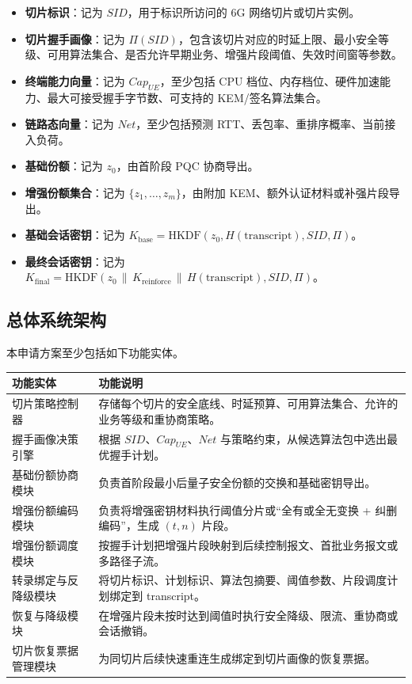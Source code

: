 \documentclass[12pt,a4paper]{article}
\newcommand{\Kfinal}{K_{\mathrm{final}}}
\newcommand{\Kbase}{K_{\mathrm{base}}}
\newcommand{\Krein}{K_{\mathrm{reinforce}}}
\begin{document}
\begin{itemize}[leftmargin=2em]
    \item \textbf{切片标识}：记为 $SID$，用于标识所访问的 6G 网络切片或切片实例。
    \item \textbf{切片握手画像}：记为 $\Pi(SID)$，包含该切片对应的时延上限、最小安全等级、可用算法集合、是否允许早期业务、增强片段阈值、失效时间窗等参数。
    \item \textbf{终端能力向量}：记为 $Cap_{UE}$，至少包括 CPU 档位、内存档位、硬件加速能力、最大可接受握手字节数、可支持的 KEM/签名算法集合。
    \item \textbf{链路态向量}：记为 $Net$，至少包括预测 RTT、丢包率、重排序概率、当前接入负荷。
    \item \textbf{基础份额}：记为 $z_0$，由首阶段 PQC 协商导出。
    \item \textbf{增强份额集合}：记为 $\{z_1,\dots,z_m\}$，由附加 KEM、额外认证材料或补强片段导出。
    \item \textbf{基础会话密钥}：记为 $\Kbase=\mathrm{HKDF}(z_0, H(\mathrm{transcript}), SID, \Pi)$。
    \item \textbf{最终会话密钥}：记为 $\Kfinal=\mathrm{HKDF}(z_0 \,\|\, \Krein \,\|\, H(\mathrm{transcript}), SID, \Pi)$。
\end{itemize}

\subsection{总体系统架构}

本申请方案至少包括如下功能实体。

\begin{center}
\renewcommand{\arraystretch}{1.4}
\begin{tabular}{|p{3cm}|p{11cm}|}
\hline
功能实体 & 功能说明 \\ \hline
切片策略控制器 & 存储每个切片的安全底线、时延预算、可用算法集合、允许的业务等级和重协商策略。 \\ \hline
握手画像决策引擎 & 根据 $SID$、$Cap_{UE}$、$Net$ 与策略约束，从候选算法包中选出最优握手计划。 \\ \hline
基础份额协商模块 & 负责首阶段最小后量子安全份额的交换和基础密钥导出。 \\ \hline
增强份额编码模块 & 负责将增强密钥材料执行阈值分片或“全有或全无变换 + 纠删编码”，生成 $(t,n)$ 片段。 \\ \hline
增强份额调度模块 & 按握手计划把增强片段映射到后续控制报文、首批业务报文或多路径子流。 \\ \hline
转录绑定与反降级模块 & 将切片标识、计划标识、算法包摘要、阈值参数、片段调度计划绑定到 transcript。 \\ \hline
恢复与降级模块 & 在增强片段未按时达到阈值时执行安全降级、限流、重协商或会话撤销。 \\ \hline
切片恢复票据管理模块 & 为同切片后续快速重连生成绑定到切片画像的恢复票据。 \\ \hline
\end{tabular}
\end{center}
\end{document}
